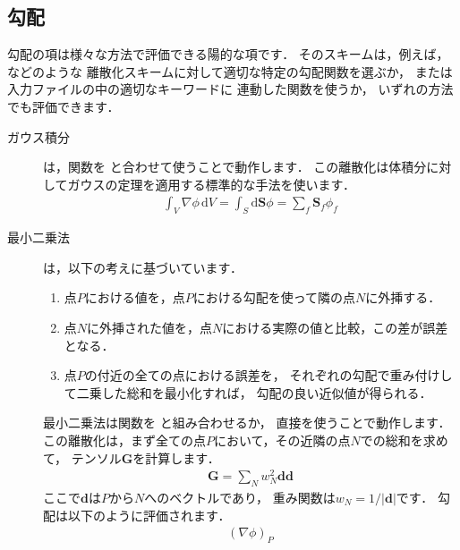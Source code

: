 \subsection{勾配}
\label{ssec:2.4.6}
勾配の項は様々な方法で評価できる陽的な項です．
そのスキームは，例えば，などのような
離散化スキームに対して適切な特定の勾配関数を選ぶか，
または入力ファイルの中の適切なキーワードに
連動した関数を使うか，
いずれの方法でも評価できます．
\begin{description}
 \item[ガウス積分] は，関数を
            と合わせて使うことで動作します．
            この離散化は体積分に対してガウスの定理を適用する標準的な手法を使います．
            \begin{align}
             \label{eq:2.25}
             \int_{V}\nabla\phi\,\mathrm{d}V
             = \int_{S}\mathrm{d}\bm{S}\phi
             = \sum_{f}\bm{S}_{f}\phi_{f}
            \end{align}
 \item[最小二乗法] は，以下の考えに基づいています．
            \begin{enumerate}
             \item 点$P$における値を，点$P$における勾配を使って隣の点$N$に外挿する．
             \item 点$N$に外挿された値を，点$N$における実際の値と比較，この差が誤差となる．
             \item 点$P$の付近の全ての点における誤差を，
                   それぞれの勾配で重み付けして二乗した総和を最小化すれば，
                   勾配の良い近似値が得られる．
            \end{enumerate}
            最小二乗法は関数を
            と組み合わせるか，
            直接を使うことで動作します．
            この離散化は，まず全ての点$P$において，その近隣の点$N$での総和を求めて，
            テンソル$\bm{G}$を計算します．
            \begin{align}
             \label{eq:2.26}
             \bm{G} = \sum_{N}w_{N}^{2}\bm{d}\bm{d}
            \end{align}
            ここで$\bm{d}$は$P$から$N$へのベクトルであり，
            重み関数は$w_{N} = 1/|\bm{d}|$です．
            勾配は以下のように評価されます．
            \begin{align}
             \label{eq:2.27}
             (\nabla\phi)_{P}

\end{align}
\end{description}
